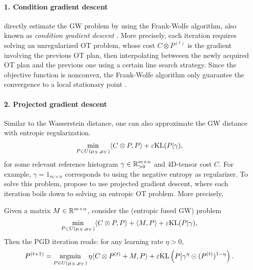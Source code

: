 \paragraph{1. Condition gradient descent} \citep{Vayer19b} directly estimate the GW problem by using
the Frank-Wolfe algorithm, also known as \textit{condition gradient descent}
\citep{Frank56,Jaggi13}. More precisely, each iteration requires
solving an unregularized OT problem, whose cost $C \otimes P^{(t)}$ is the gradient
involving the previous OT plan, then interpolating betweeen the newly acquired OT plan and
the previous one using a certain line search strategy. Since the objective function is nonconvex,
the Frank-Wolfe algorithm only guarantee the convergence to a local stationary point \citep{Julien16}.

\paragraph{2. Projected gradient descent} Similar to the Wasserstein distance,
one can also approximate the GW distance with entropic regularization.
\begin{align}
  \min_{\substack{P \in U(\mu_X, \mu_Y)}} \langle C \otimes P, P \rangle + \varepsilon \text{KL}(P | \gamma),
\end{align}
for some relevant reference histogram $\gamma \in \mathbb R^{m \times n}_{> 0}$ and $4$D-tensor cost $C$.
For example, $\gamma = 1_{m \times n}$ corresponds to using the negative entropy as regularizer.
To solve this problem, \citep{Peyre16,Solomon16} propose to use projected gradient descent,
where each iteration boils down to solving an entropic OT problem. More precisely,
\begin{lemma}
   Given a matrix $M \in \mathbb R^{m \times n}$,
  consider the (entropic fused GW) problem
  \begin{align}
    \label{eq:fused_egw}
    \min_{\substack{P \in U(\mu_X, \mu_Y)}} \langle C \otimes P, P \rangle
    + \langle M, P \rangle + \varepsilon \text{KL}(P | \gamma),
  \end{align}
  Then the PGD iteration reads: for any learning rate $\eta > 0$,
  \begin{align}
    P^{(t+1)} = \operatorname*{argmin}_{P \in U(\mu_X, \mu_Y)}
    \eta \langle C \otimes P^{(t)} + M, P \rangle
    + \varepsilon \text{KL} \left( P \big| \gamma^{\eta} \odot (P^{(t)})^{1 - \eta} \right).
  \end{align}
\end{lemma}
